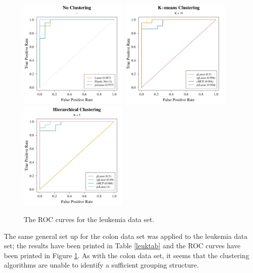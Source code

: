 \documentclass[11pt]{article}
\begin{document}
{\begin{landscape}
\begin{table}[p]
\end{table}

\vspace{0.5cm}

\begin{figure}[p]
    \centering
    \includegraphics[width = 0.475\textwidth]{leuk_ROC_no_n.pdf}
    \includegraphics[width = 0.475\textwidth]{leuk_ROC_k_n.pdf}
    \includegraphics[width = 0.475\textwidth]{leuk_ROC_h_n.pdf}
    \caption{The ROC curves for the leukemia data set.}
    \label{leukROC}
\end{figure}

\end{landscape}
}

The same general set up for the colon data set was applied to the leukemia data set; the results have been printed in Table \ref{leuktab} and the ROC curves have been printed in Figure \ref{leukROC}. As with the colon data set, it seems that the clustering algorithms are unable to identify a sufficient grouping structure. 
\end{document}
